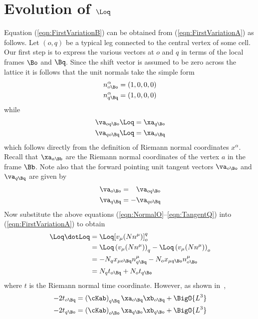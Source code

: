 \documentclass[a4paper,12pt]{article}
\numberwithin{equation}{section}
\begin{document}
\section{Evolution of $\Loq$}
\label{sec:EvolveLenoq}

Equation (\ref{eqn:FirstVariationB}) can be obtained from (\ref{eqn:FirstVariationA}) as
follows. Let $(o,q)$ be a typical leg connected to the central vertex of some cell. Our
first step is to express the various vectors at $o$ and $q$ in terms of the local frames
$\Bo$ and $\Bq$. Since the shift vector is assumed to be zero across the lattice it is
follows that the unit normals take the simple form
\begin{align}
   \label{eqn:NormalO}n^\alpha_{o\Bo} &= (1,0,0,0)\\
   \label{eqn:NormalQ}n^\alpha_{q\Bq} &= (1,0,0,0)
\end{align}
while
\begin{align}
   \label{eqn:VectorMO} \va_{oq\Bo} \Loq &= \xa_{q\Bo}\\
   \label{eqn:VectorMQ} \va_{qo\Bq} \Loq &= \xa_{o\Bq}
\end{align}
which follows directly from the definition of Riemann normal coordinates $x^\alpha$. Recall
that $\xa_{a\Bb}$ are the Riemann normal coordinates of the vertex $a$ in the frame
$\Bb$. Note also that the forward pointing unit tangent vectors $\va_{o\Bo}$ and
$\va_{q\Bq}$ are given by
\begin{align}
   \label{eqn:TangentO} \va_{o\Bo} &= \phantom{-} \va_{oq\Bo}\\
   \label{eqn:TangentQ} \va_{q\Bq} &= -\va_{qo\Bq}
\end{align}
Now substitute the above equations (\ref{eqn:NormalO}--\ref{eqn:TangentQ}) into
(\ref{eqn:FirstVariationA}) to obtain
\begin{align}
   \Loq\dotLoq &= \Loq [v_\mu (Nn^\mu)]_o^q\\
               &= \Loq \left(v_\mu (Nn^\mu)\right)_q - \Loq \left(v_\mu (Nn^\mu)\right)_o\\
               &= -N_q x_{\mu o\Bq} n^\mu_{q\Bq} - N_o x_{\mu q\Bo} n^\mu_{o\Bo}\\
               &= N_q t_{o\Bq} + N_o t_{q\Bo}
\end{align}
where $t$ is the Riemann normal time coordinate. However, as shown
in~\cite{brewin:2010-03},
\begin{align}
   -2 t_{o\Bq} &= \left(\cKab\right)_{q\Bq} \xa_{o\Bq} \xb_{o\Bq} + \BigO{L^3}\\
   -2 t_{q\Bo} &= \left(\cKab\right)_{o\Bo} \xa_{q\Bo} \xb_{q\Bo} + \BigO{L^3}
\end{align}
\end{document}
